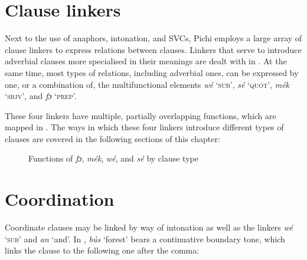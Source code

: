 \section{Clause linkers}\label{sec:10.2}

Next to the use of anaphors, intonation, and SVCs, Pichi employs a large array of clause linkers to express relations between clauses. Linkers that serve to introduce adverbial clauses more specialised in their meanings are dealt with in . At the same time, most types of relations, including adverbial ones, can be expressed by one, or a combination of, the multifunctional elements \textit{wé} \textsc{‘sub’,} \textit{sé} \textsc{‘quot’,} \textit{mék} \textsc{‘sbjv’,} and \textit{fɔ} \textsc{‘prep’.} 


These four linkers have multiple, partially overlapping functions, which are mapped in . The ways in which these four linkers introduce different types of clauses are covered in the following sections of this chapter:

\begin{figure}
\caption{Functions of \textit{fɔ}, \textit{mék}, \textit{wé}, and \textit{sé} by clause type}
\label{fig:key:10.1}
\end{figure}
\section{Coordination}\label{sec:10.3}

Coordinate clauses may be linked by way of intonation as well as the linkers \textit{wé} ‘\textsc{sub}’ and \textit{an} ‘and’. In , \textit{bús} ‘forest’ bears a continuative boundary tone, which links the clause to the following one after the comma: 


